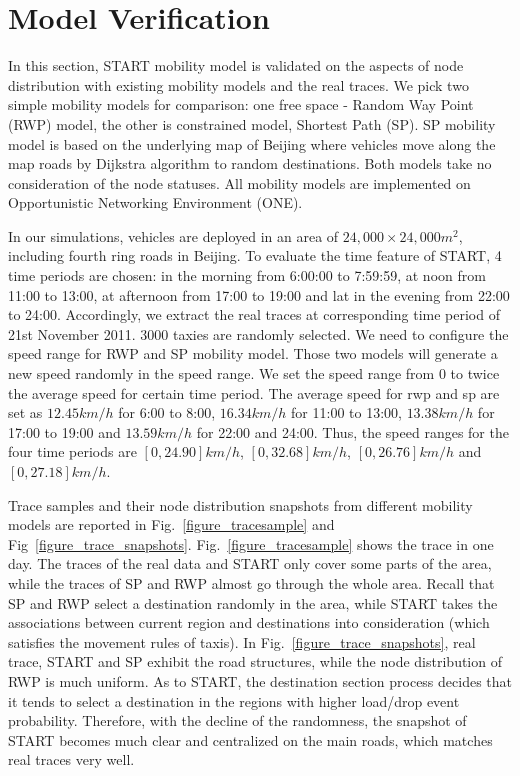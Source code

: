 \section{Model Verification}
\label{section_model_varification}

In this section, START mobility model is validated on the aspects of node distribution with existing mobility models and the real traces. We pick two simple mobility models for comparison: one free space - Random Way Point (RWP) model, the other is constrained model, Shortest Path (SP).  SP mobility model is based on the underlying map of Beijing where vehicles move along the map roads by Dijkstra algorithm to random destinations. Both models take no consideration of the node statuses. All mobility models are implemented on Opportunistic Networking Environment (ONE)\cite{KeranenOtt-155}.

In our simulations, vehicles are deployed in an area of $24,000\times 24,000 m^2$, including fourth ring roads in Beijing.
To evaluate the time feature of START, 4 time periods are chosen: in the morning from 6:00:00 to 7:59:59, at noon from 11:00 to 13:00, at afternoon from 17:00 to 19:00 and lat in the evening from 22:00 to 24:00. Accordingly, we extract the real traces at corresponding time period of 21st November 2011.
3000 taxies are randomly selected. 
We need to configure the speed range for RWP and SP mobility model. Those two models will generate a new speed randomly in the speed range. We set the speed range from 0 to twice the average speed for certain time period.
The average speed for rwp and sp are set as $12.45 km/h$ for 6:00 to 8:00, $16.34km/h$ for 11:00 to 13:00, $13.38km/h$ for 17:00 to 19:00 and $13.59 km/h$ for 22:00 and 24:00. 
Thus, the speed ranges for the four time periods are $[0, 24.90]km/h$, $[0, 32.68]km/h$, $[0, 26.76]km/h$ and $[0, 27.18]km/h$.

Trace samples and their node distribution snapshots from different mobility models are reported in Fig.~\ref{figure_tracesample} and Fig~\ref{figure_trace_snapshots}. Fig.~\ref{figure_tracesample} shows the trace in one day. The traces of the real data and START only cover some parts of the area, while the traces of SP and RWP almost go through the whole area. Recall that SP and RWP select a destination randomly in the area, while START takes the associations between current region and destinations into consideration (which satisfies the movement rules of taxis). In Fig.~\ref{figure_trace_snapshots}, real trace, START and SP exhibit the road structures, while the node distribution of RWP is much uniform. As to START, the destination section process decides that it tends to select a destination in the regions with higher load/drop event probability. Therefore, with the decline of the randomness, the snapshot of START becomes much clear and centralized on the main roads, which matches real traces very well.

